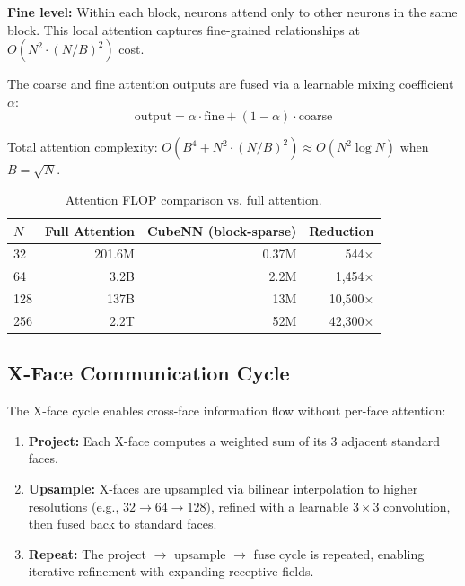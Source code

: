 \documentclass{article}
\begin{document}
\textbf{Fine level:} Within each block, neurons attend only to other neurons in the same block. This local attention captures fine-grained relationships at $O(N^2 \cdot (N/B)^2)$ cost.

The coarse and fine attention outputs are fused via a learnable mixing coefficient $\alpha$:
\begin{equation}
    \text{output} = \alpha \cdot \text{fine} + (1-\alpha) \cdot \text{coarse}
\end{equation}

Total attention complexity: $O(B^4 + N^2 \cdot (N/B)^2) \approx O(N^2 \log N)$ when $B = \sqrt{N}$.

\begin{table}[h]
\centering
\caption{Attention FLOP comparison vs. full attention.}
\begin{tabular}{lrrr}
\toprule
$N$ & Full Attention & CubeNN (block-sparse) & Reduction \\
\midrule
32  & 201.6M & 0.37M  & 544$\times$ \\
64  & 3.2B   & 2.2M   & 1,454$\times$ \\
128 & 137B   & 13M    & 10,500$\times$ \\
256 & 2.2T   & 52M    & 42,300$\times$ \\
\bottomrule
\end{tabular}
\end{table}

\subsection{X-Face Communication Cycle}

The X-face cycle enables cross-face information flow without per-face attention:

\begin{enumerate}
    \item \textbf{Project:} Each X-face computes a weighted sum of its 3 adjacent standard faces.
    \item \textbf{Upsample:} X-faces are upsampled via bilinear interpolation to higher resolutions (e.g., $32{\rightarrow}64{\rightarrow}128$), refined with a learnable $3{\times}3$ convolution, then fused back to standard faces.
    \item \textbf{Repeat:} The project $\rightarrow$ upsample $\rightarrow$ fuse cycle is repeated, enabling iterative refinement with expanding receptive fields.
\end{enumerate}
\end{document}
